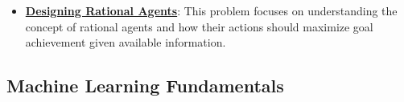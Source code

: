 \documentclass{article}%
\begin{document}
\begin{itemize}[leftmargin=*]
\item \href{https://purdue.brightspace.com/d2l/common/assets/pdfjs-d2l-dist/1.0.14-legacy/web/viewer.html?file=\%2Fcontent\%2Fenforced\%2F1095467-wl.202510.CS.24300.001\%2F14L1-DepthFS.pdf\%3Fou\%3D1095467\&lang=en-us\&container=d2l-fileviewer-rendered-pdf\&fullscreen=d2l-fileviewer-rendered-pdf-dialog\&height=667#page=39}{\textbf{Designing Rational Agents}}: This problem focuses on understanding the concept of rational agents and how their actions should maximize goal achievement given available information.%
\end{itemize}

%
\subsection{Machine Learning Fundamentals}%
\label{subsec:MachineLearningFundamentals}%
\end{document}
